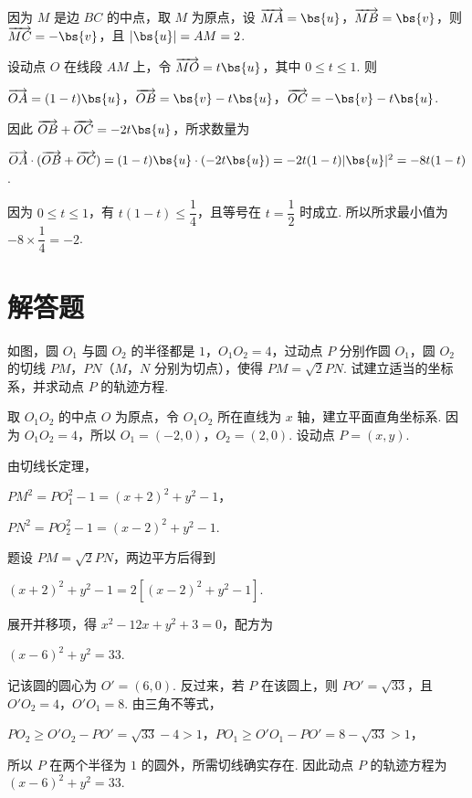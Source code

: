 \begin{solution}
因为 \(M\) 是边 \(BC\) 的中点，取 \(M\) 为原点，设 \(\overrightarrow{MA}=\bs{u}\)，\(\overrightarrow{MB}=\bs{v}\)，则 \(\overrightarrow{MC}=-\bs{v}\)，且 \(|\bs{u}|=AM=2\).

设动点 \(O\) 在线段 \(AM\) 上，令 \(\overrightarrow{MO}=t\bs{u}\)，其中 \(0\leqslant t\leqslant1\). 则

\(\overrightarrow{OA}=(1-t)\bs{u}\)，\(\overrightarrow{OB}=\bs{v}-t\bs{u}\)，\(\overrightarrow{OC}=-\bs{v}-t\bs{u}\).

因此 \(\overrightarrow{OB}+\overrightarrow{OC}=-2t\bs{u}\)，所求数量为

\(\overrightarrow{OA}\cdot(\overrightarrow{OB}+\overrightarrow{OC})=(1-t)\bs{u}\cdot(-2t\bs{u})=-2t(1-t)|\bs{u}|^2=-8t(1-t)\).

因为 \(0\leqslant t\leqslant1\)，有 \(t(1-t)\leqslant\dfrac14\)，且等号在 \(t=\dfrac12\) 时成立. 所以所求最小值为 \(-8\times\dfrac14=-2\).
\end{solution}

\section{解答题}
\begin{problem}
如图，圆 \(O_{1}\) 与圆 \(O_{2}\) 的半径都是 \(1\)，\(O_{1}O_{2} = 4\)，过动点 \(P\) 分别作圆 \(O_{1}\)，圆 \(O_{2}\) 的切线 \(PM\)，\(PN\)（\(M\)，\(N\) 分别为切点），使得 \(PM = \sqrt{2}PN\). 试建立适当的坐标系，并求动点 \(P\) 的轨迹方程.

\end{problem}

\begin{solution}
取 \(O_1O_2\) 的中点 \(O\) 为原点，令 \(O_1O_2\) 所在直线为 \(x\) 轴，建立平面直角坐标系. 因为 \(O_1O_2=4\)，所以 \(O_1=(-2,0)\)，\(O_2=(2,0)\). 设动点 \(P=(x,y)\).

由切线长定理，

\(PM^2=PO_1^2-1=(x+2)^2+y^2-1\)，

\(PN^2=PO_2^2-1=(x-2)^2+y^2-1\).

题设 \(PM=\sqrt{2}PN\)，两边平方后得到

\((x+2)^2+y^2-1=2\left[(x-2)^2+y^2-1\right]\).

展开并移项，得 \(x^2-12x+y^2+3=0\)，配方为

\((x-6)^2+y^2=33\).

记该圆的圆心为 \(O'=(6,0)\). 反过来，若 \(P\) 在该圆上，则 \(PO'=\sqrt{33}\)，且 \(O'O_2=4\)，\(O'O_1=8\). 由三角不等式，

\(PO_2\geqslant O'O_2-PO'=\sqrt{33}-4>1\)，\(PO_1\geqslant O'O_1-PO'=8-\sqrt{33}>1\)，

所以 \(P\) 在两个半径为 \(1\) 的圆外，所需切线确实存在. 因此动点 \(P\) 的轨迹方程为 \((x-6)^2+y^2=33\).
\end{solution}

